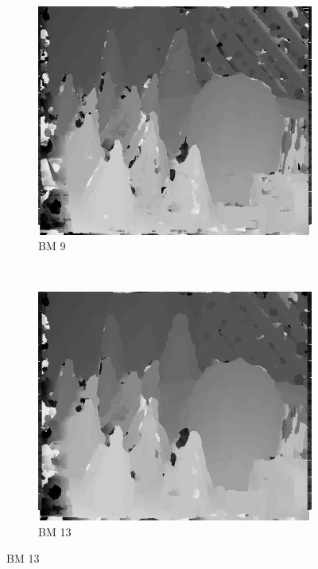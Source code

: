 \begin{figure}

  \begin{subfigure}[b]{0.23\textwidth}
    \centering
    \includegraphics[width=\textwidth]{images/stereo-pairs/cones_bm_9.png}
    \caption{BM 9}
  \end{subfigure}
  ~
  \begin{subfigure}[b]{0.23\textwidth}
    \centering
    \includegraphics[width=\textwidth]{images/stereo-pairs/cones_bm_13.png}
    \caption{BM 13}
  \end{subfigure}

\end{figure}

